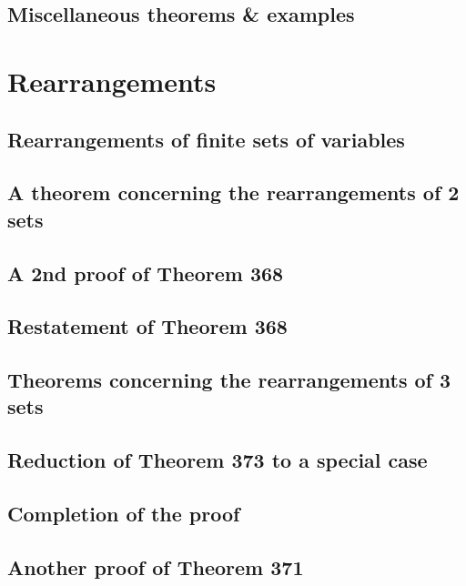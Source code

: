 \documentclass[oneside]{book}
\numberwithin{equation}{section}
\begin{document}
\subsection{Miscellaneous theorems \& examples}


\section{Rearrangements}

\subsection{Rearrangements of finite sets of variables}

\subsection{A theorem concerning the rearrangements of 2 sets}

\subsection{A 2nd proof of Theorem 368}

\subsection{Restatement of Theorem 368}

\subsection{Theorems concerning the rearrangements of 3 sets}

\subsection{Reduction of Theorem 373 to a special case}

\subsection{Completion of the proof}

\subsection{Another proof of Theorem 371}
\end{document}
